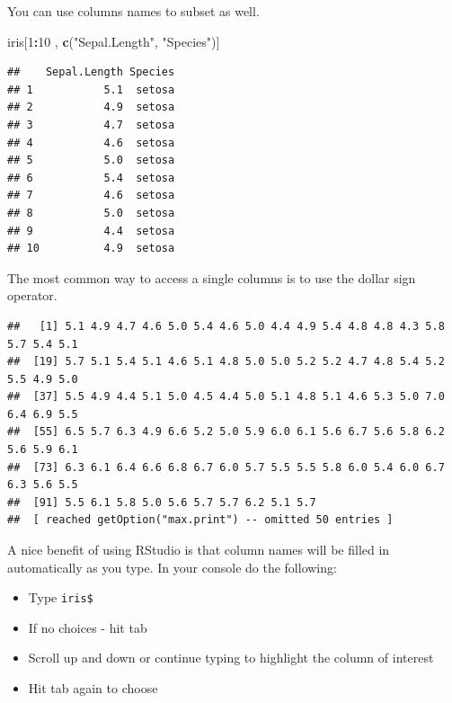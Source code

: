 \documentclass[
]{book}
\newenvironment{Shaded}{\begin{snugshade}}{\end{snugshade}}
\newcommand{\DecValTok}[1]{\textcolor[rgb]{0.00,0.00,0.81}{#1}}
\newcommand{\KeywordTok}[1]{\textcolor[rgb]{0.13,0.29,0.53}{\textbf{#1}}}
\newcommand{\NormalTok}[1]{#1}
\newcommand{\OperatorTok}[1]{\textcolor[rgb]{0.81,0.36,0.00}{\textbf{#1}}}
\newcommand{\StringTok}[1]{\textcolor[rgb]{0.31,0.60,0.02}{#1}}
\providecommand{\tightlist}{%
  \setlength{\itemsep}{0pt}\setlength{\parskip}{0pt}}
\theoremstyle{definition}
\theoremstyle{definition}
\theoremstyle{definition}
\theoremstyle{remark}
\begin{document}
You can use columns names to subset as well.

\begin{Shaded}
\begin{Highlighting}[]
\NormalTok{iris[}\DecValTok{1}\OperatorTok{:}\DecValTok{10}\NormalTok{ , }\KeywordTok{c}\NormalTok{(}\StringTok{"Sepal.Length"}\NormalTok{, }\StringTok{"Species"}\NormalTok{)]}
\end{Highlighting}
\end{Shaded}

\begin{verbatim}
##    Sepal.Length Species
## 1           5.1  setosa
## 2           4.9  setosa
## 3           4.7  setosa
## 4           4.6  setosa
## 5           5.0  setosa
## 6           5.4  setosa
## 7           4.6  setosa
## 8           5.0  setosa
## 9           4.4  setosa
## 10          4.9  setosa
\end{verbatim}

The most common way to access a single columns is to use the dollar sign operator.

\begin{Shaded}
\end{Shaded}

\begin{verbatim}
##   [1] 5.1 4.9 4.7 4.6 5.0 5.4 4.6 5.0 4.4 4.9 5.4 4.8 4.8 4.3 5.8 5.7 5.4 5.1
##  [19] 5.7 5.1 5.4 5.1 4.6 5.1 4.8 5.0 5.0 5.2 5.2 4.7 4.8 5.4 5.2 5.5 4.9 5.0
##  [37] 5.5 4.9 4.4 5.1 5.0 4.5 4.4 5.0 5.1 4.8 5.1 4.6 5.3 5.0 7.0 6.4 6.9 5.5
##  [55] 6.5 5.7 6.3 4.9 6.6 5.2 5.0 5.9 6.0 6.1 5.6 6.7 5.6 5.8 6.2 5.6 5.9 6.1
##  [73] 6.3 6.1 6.4 6.6 6.8 6.7 6.0 5.7 5.5 5.5 5.8 6.0 5.4 6.0 6.7 6.3 5.6 5.5
##  [91] 5.5 6.1 5.8 5.0 5.6 5.7 5.7 6.2 5.1 5.7
##  [ reached getOption("max.print") -- omitted 50 entries ]
\end{verbatim}

A nice benefit of using RStudio is that column names will be filled in automatically as you type. In your console do the following:

\begin{itemize}
\tightlist
\item
  Type \texttt{iris\$}\\
\item
  If no choices - hit tab
\item
  Scroll up and down or continue typing to highlight the column of interest\\
\item
  Hit tab again to choose
\end{itemize}
\end{document}
